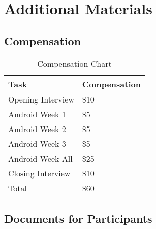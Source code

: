 \chapter{Additional Materials}

\section{Compensation}

\renewcommand{\arraystretch}{1.2}
\begin{table}[h]
\centering
\caption{Compensation Chart}
\label{table:compensation}
\begin{tabular}{ l l }
Task & Compensation \\
\hline
Opening Interview & \$10 \\[5pt]
Android Week 1 & \$5 \\[5pt]
Android Week 2 & \$5 \\[5pt]
Android Week 3 & \$5 \\[5pt]
Android Week All & \$25 \\[5pt]
Closing Interview & \$10 \\[5pt]
\hline
Total & \$60
\end{tabular}
\end{table}

\section{Documents for Participants}








\clearpage
\newpage
